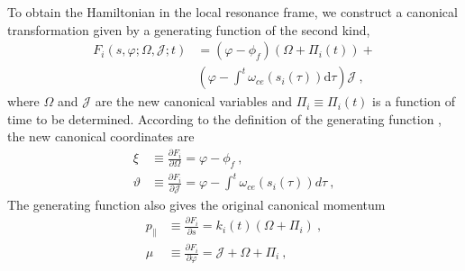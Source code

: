 To obtain the Hamiltonian in the local resonance frame, 
we construct a  canonical transformation given by a generating function of the second kind,
\begin{equation}\label{eq.gf2}
\begin{aligned}
        F_{i}(s, \varphi ; \Omega, \mathcal{J};t) & = \left(\varphi - \phi_f \right) \left(\Omega+\Pi_{i}(t)\right)  +
        \\
        &\left(\varphi-\int^{t} \omega_{ce}\left(s_{i}(\tau)\right)\mathrm{d}\tau\right)\mathcal{J}~,
\end{aligned}
\end{equation}
where 
$\Omega$ and $\mathcal{J}$ are the new canonical variables
and $\Pi_i\equiv\Pi_i(t)$
is a  function
of time to be determined.
According to the definition of the generating function \cite{goldstein2001}, 
the new canonical coordinates are 
\begin{equation}\label{eq.newQ}
    \begin{aligned}
         \xi & \equiv \frac{\partial F_i}{\partial \Omega} =  \varphi - \phi_f~,
         \\ 
        \vartheta & \equiv   \frac{\partial F_i}{\partial \mathcal{J}} = \varphi -\int^{t} \omega_{c e}\left(s_{i}(\tau)\right) d \tau ~,
    \end{aligned}
\end{equation}
The generating function also gives the original canonical momentum
\begin{equation}\label{eq.oldP}
    \begin{aligned}
        p_\| & \equiv \frac{\partial F_i}{\partial s} = k_{i}(t)( \Omega+\Pi_{i})~,
        \\
        \mu & \equiv \frac{\partial F_i}{\partial \varphi} = \mathcal{J} +\Omega+\Pi_{i}~,
    \end{aligned}
\end{equation}
